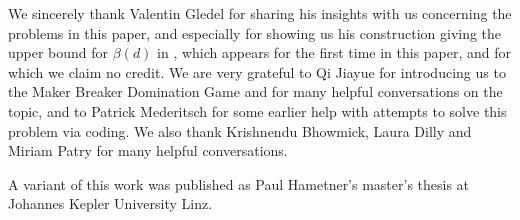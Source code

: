 \documentclass[a4paper,11pt,oneside]{scrartcl}
\theoremstyle{definition}
\theoremstyle{remark}
\begin{document}
We sincerely thank Valentin Gledel for sharing his insights with us concerning the problems in this paper, and especially for showing us his construction giving the upper bound for $\beta(d)$ in , which appears for the first time in this paper, and for which we claim no credit. We are very grateful to Qi Jiayue for introducing us to the Maker Breaker Domination Game and for many helpful conversations on the topic, and to Patrick Mederitsch for some earlier help with attempts to solve this problem via coding. We also thank Krishnendu Bhowmick, Laura Dilly and Miriam Patry for many helpful conversations.

A variant of this work was published as Paul Hametner's master's thesis at Johannes Kepler University Linz.




\end{document}

